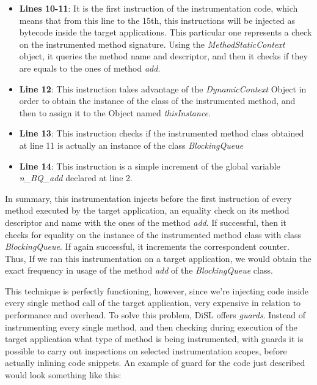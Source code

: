 \documentclass[]{usiinfthesis}
\begin{document}
\begin{itemize}
    \item \textbf{Lines 10-11}: It is the first instruction of the instrumentation code, which means that from this line to the 15th, this instructions will be injected as bytecode inside the target applications. This particular one represents a check on the instrumented method signature. Using the \textit{MethodStaticContext} object, it queries the method name and descriptor, and then it checks if they are equals to the ones of method \textit{add}.
    
    \item \textbf{Line 12}: This instruction takes advantage of the \textit{DynamicContext} Object in order to obtain the instance of the class of the instrumented method, and then to assign it to the Object named \textit{thisInstance}.
    
    \item \textbf{Line 13}: This instruction checks if the instrumented method class obtained at line 11 is actually an instance of the class \textit{BlockingQueue}
    
    \item \textbf{Line 14}: This instruction is a simple increment of the global variable \textit{n\_BQ\_add} declared at line 2.
\end{itemize}
In summary, this instrumentation injects before the first instruction of every method executed by the target application, an equality check on its method descriptor and name with the ones of the method \textit{add}. If successful, then it checks for equality on the instance of the instrumented method class with class \textit{BlockingQueue}. If again successful, it increments the correspondent counter. Thus, If we ran this instrumentation on a target application, we would obtain the exact frequency in usage of the method \textit{add} of the \textit{BlockingQueue} class. 

\noindent
This technique is perfectly functioning, however, since we're injecting code inside every single method call of the target application, very expensive in relation to performance and overhead. To solve this problem, DiSL offers \textit{guards}. Instead of instrumenting every single method, and then checking during execution of the target application what type of method is being instrumented, with guards it is possible to carry out inspections on selected instrumentation scopes, before actually inlining code snippets. An example of guard for the code just described would look something like this:
\end{document}
